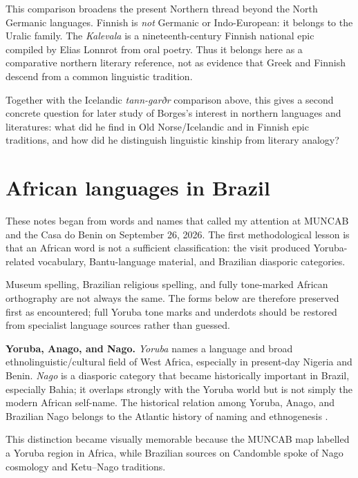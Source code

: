 This comparison broadens the present Northern thread beyond the North
Germanic languages. Finnish is \emph{not} Germanic or Indo-European: it
belongs to the Uralic family. The \emph{Kalevala} is a nineteenth-century
Finnish national epic compiled by Elias Lonnrot from oral poetry. Thus it
belongs here as a comparative northern literary reference, not as evidence
that Greek and Finnish descend from a common linguistic tradition.

Together with the Icelandic \emph{tann-garðr} comparison above, this gives a
second concrete question for later study of Borges's interest in northern
languages and literatures: what did he find in Old Norse/Icelandic and in
Finnish epic traditions, and how did he distinguish linguistic kinship from
literary analogy?

\section{African languages in Brazil}
\label{section-african-words-salvador}

These notes began from words and names that
called my attention at MUNCAB and
the Casa do Benin on September 26, 2026. The
first methodological lesson is
that an African word is not a sufficient
classification: the visit produced
Yoruba-related vocabulary, Bantu-language
material, and Brazilian diasporic
categories.

Museum spelling, Brazilian religious
spelling, and fully tone-marked African
orthography are not always the same. The
forms below are therefore preserved
first as encountered; full Yoruba tone marks
and underdots should be restored
from specialist language sources rather than
guessed.

\medskip\noindent
{\bf Yoruba, Anago, and Nago.}
\emph{Yoruba} names a language and broad
ethnolinguistic/cultural field of
West Africa, especially in present-day
Nigeria and Benin. \emph{Nago} is a
diasporic category that became historically
important in Brazil, especially
Bahia; it overlaps strongly with the Yoruba
world but is not simply the modern
African self-name. The historical relation
among Yoruba, Anago, and Brazilian
Nago belongs to the Atlantic history of
naming and ethnogenesis
\cite{lovejoyojo2015lucumi,pares2010nago}.

This distinction became visually memorable
because the MUNCAB map labelled a
Yoruba region in Africa, while Brazilian
sources on Candomble spoke of Nago
cosmology and Ketu--Nago traditions.

